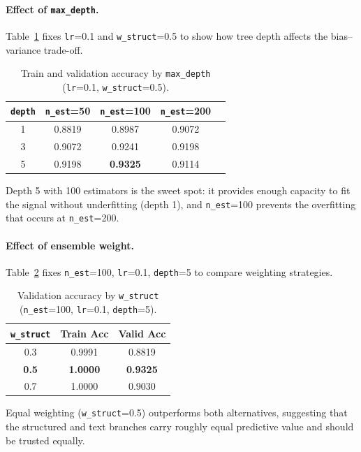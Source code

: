 \documentclass[11pt,letterpaper]{article}
\begin{document}
\paragraph{Effect of \texttt{max\_depth}.}
Table~\ref{tab:depth} fixes \texttt{lr}=0.1 and \texttt{w\_struct}=0.5 to
show how tree depth affects the bias--variance trade-off.

\begin{table}[H]
\centering
\caption{Train and validation accuracy by \texttt{max\_depth}
(\texttt{lr}=0.1, \texttt{w\_struct}=0.5).}
\label{tab:depth}
\begin{tabular}{ccccc}
\toprule
\texttt{depth} & \texttt{n\_est}=50 & \texttt{n\_est}=100 & \texttt{n\_est}=200 \\
\midrule
1 & 0.8819 & 0.8987 & 0.9072 \\
3 & 0.9072 & 0.9241 & 0.9198 \\
5 & 0.9198 & \textbf{0.9325} & 0.9114 \\
\bottomrule
\end{tabular}
\end{table}

\noindent Depth 5 with 100 estimators is the sweet spot: it
provides enough capacity to fit the signal without underfitting (depth 1), and
\texttt{n\_est}=100 prevents the overfitting that occurs at \texttt{n\_est}=200.

\paragraph{Effect of ensemble weight.}
Table~\ref{tab:wstruct} fixes \texttt{n\_est}=100, \texttt{lr}=0.1,
\texttt{depth}=5 to compare weighting strategies.

\begin{table}[H]
\centering
\caption{Validation accuracy by \texttt{w\_struct}
(\texttt{n\_est}=100, \texttt{lr}=0.1, \texttt{depth}=5).}
\label{tab:wstruct}
\begin{tabular}{ccc}
\toprule
\texttt{w\_struct} & \textbf{Train Acc} & \textbf{Valid Acc} \\
\midrule
0.3 & 0.9991 & 0.8819 \\
\textbf{0.5} & \textbf{1.0000} & \textbf{0.9325} \\
0.7 & 1.0000 & 0.9030 \\
\bottomrule
\end{tabular}
\end{table}

\noindent Equal weighting (\texttt{w\_struct}=0.5) outperforms both alternatives,
suggesting that the structured and text branches carry roughly equal predictive
value and should be trusted equally.
\end{document}
